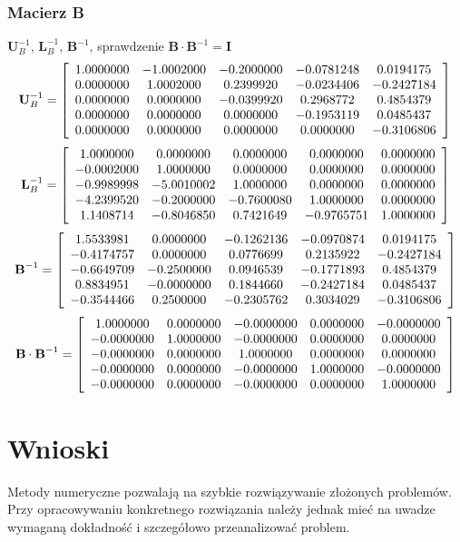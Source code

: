 \documentclass[a4paper]{article}
\begin{document}
\subsubsection{Macierz B}
$\textbf{U}_B^{-1}$, $\textbf{L}_B^{-1}$, $\textbf{B}^{-1}$, sprawdzenie $\textbf{B} \cdot \textbf{B}^{-1} = \textbf{I}$ \\
$$
\\ \textbf{U}_B^{-1} = 
\left[
\begin{array}{ccccc}
1.0000000&-1.0002000&-0.2000000&-0.0781248&0.0194175\\ 
0.0000000&1.0002000&0.2399920&-0.0234406&-0.2427184\\ 
0.0000000&0.0000000&-0.0399920&0.2968772&0.4854379\\ 
0.0000000&0.0000000&0.0000000&-0.1953119&0.0485437\\ 
0.0000000&0.0000000&0.0000000&0.0000000&-0.3106806
\end{array}
\right] \\ \\ \hfill
$$
$$
\\ \textbf{L}_B^{-1} = 
\left[
\begin{array}{ccccc}
1.0000000&0.0000000&0.0000000&0.0000000&0.0000000\\ 
-0.0002000&1.0000000&0.0000000&0.0000000&0.0000000\\ 
-0.9989998&-5.0010002&1.0000000&0.0000000&0.0000000\\ 
-4.2399520&-0.2000000&-0.7600080&1.0000000&0.0000000\\ 
1.1408714&-0.8046850&0.7421649&-0.9765751&1.0000000
\end{array}
\right]
$$
$$
\\ \textbf{B}^{-1} = 
\left[
\begin{array}{ccccc}
1.5533981&0.0000000&-0.1262136&-0.0970874&0.0194175\\ 
-0.4174757&0.0000000&0.0776699&0.2135922&-0.2427184\\ 
-0.6649709&-0.2500000&0.0946539&-0.1771893&0.4854379\\ 
0.8834951&-0.0000000&0.1844660&-0.2427184&0.0485437\\ 
-0.3544466&0.2500000&-0.2305762&0.3034029&-0.3106806
\end{array}
\right]
$$
$$
\\ \\ \textbf{B} \cdot \textbf{B}^{-1} = 
\left[
\begin{array}{ccccc}
1.0000000&0.0000000&-0.0000000&0.0000000&-0.0000000\\ 
-0.0000000&1.0000000&-0.0000000&0.0000000&0.0000000\\ 
-0.0000000&0.0000000&1.0000000&0.0000000&0.0000000\\ 
-0.0000000&0.0000000&-0.0000000&1.0000000&-0.0000000\\ 
-0.0000000&0.0000000&-0.0000000&0.0000000&1.0000000
\end{array}
\right]
$$
\section{Wnioski}
Metody numeryczne pozwalają na szybkie rozwiązywanie złożonych problemów. Przy opracowywaniu konkretnego rozwiązania należy jednak mieć na uwadze wymaganą dokładność i szczegółowo przeanalizować problem. 
\end{document}
